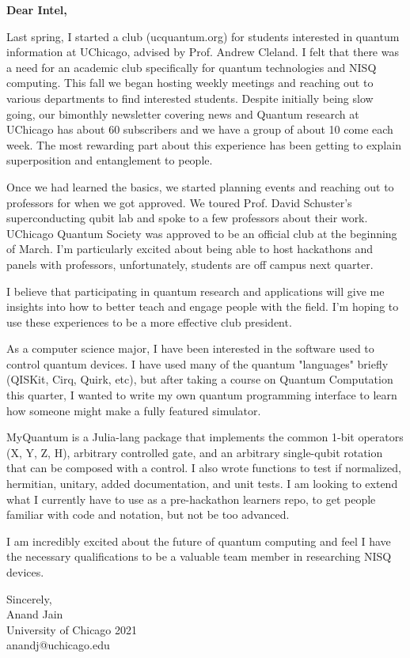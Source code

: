 \documentclass[11pt]{letter} %
\begin{document}
\begin{letter}{}

\opening{\textbf{Dear Intel,}}

Last spring, I started a club (ucquantum.org) for students interested in quantum information at UChicago, advised by Prof. Andrew Cleland.
I felt that there was a need for an academic club specifically for quantum technologies and NISQ computing.
This fall we began hosting weekly meetings and reaching out to various departments to find interested students.
Despite initially being slow going, our bimonthly newsletter covering news and Quantum research at UChicago has about 60 subscribers and we have a group of about 10 come each week.
The most rewarding part about this experience has been getting to explain superposition and entanglement to people.
 
Once we had learned the basics, we started planning events and reaching out to professors for when we got approved.
We toured Prof. David Schuster's superconducting qubit lab and spoke to a few professors about their work.
UChicago Quantum Society was approved to be an official club at the beginning of March.
I'm particularly excited about being able to host hackathons and panels with professors, unfortunately, students are off campus next quarter.
 
I believe that participating in quantum research and applications will give me insights into how to better teach and engage people with the field.
I'm hoping to use these experiences to be a more effective club president.
 
As a computer science major, I have been interested in the software used to control quantum devices.
I have used many of the quantum "languages" briefly (QISKit, Cirq, Quirk, etc), but after taking a course on Quantum Computation this quarter, I wanted to write my own quantum programming interface to learn how someone might make a fully featured simulator.
 
MyQuantum is a Julia-lang package that implements the common 1-bit operators (X, Y, Z, H), arbitrary controlled gate, and an arbitrary single-qubit rotation that can be composed with a control.
I also wrote functions to test if normalized, hermitian, unitary, added documentation, and unit tests.
I am looking to extend what I currently have to use as a pre-hackathon learners repo, to get people familiar with code and notation, but not be too advanced.
 
I am incredibly excited about the future of quantum computing and feel I have the necessary qualifications
to be a valuable team member in researching NISQ devices.

\begin{flushright}
    Sincerely, \\ Anand Jain \\ University of Chicago 2021 \\ anandj@uchicago.edu
\end{flushright} 

\end{letter}
 
\end{document}
